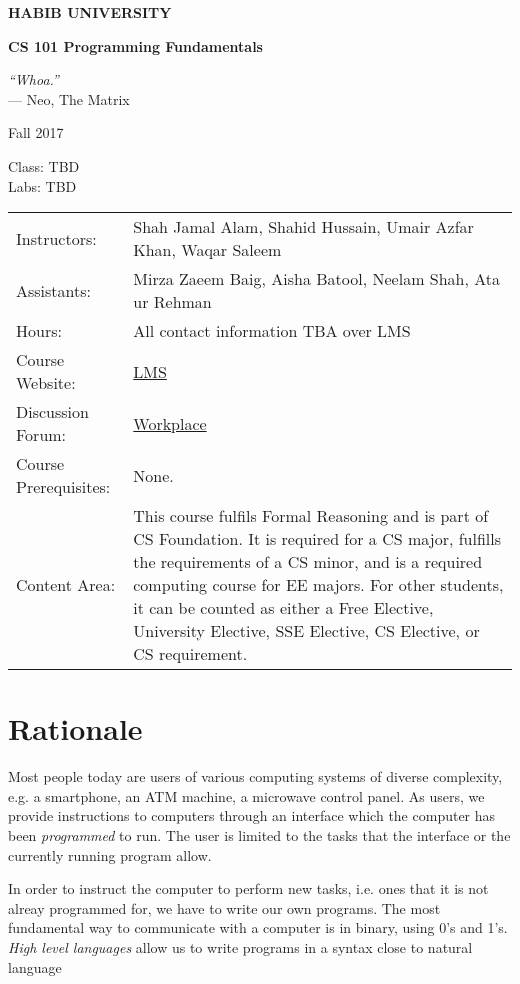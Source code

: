 \documentclass[a4paper]{article}
\begin{document}
\begin{center}

  {\LARGE\bf HABIB UNIVERSITY}\bigskip

  {\large\bf CS 101 Programming Fundamentals}\medskip

  {\it ``Whoa.''}\\--- Neo, The Matrix\medskip

  Fall 2017\medskip
  
  Class: TBD\\
  Labs: TBD

\begin{tabular}{lp{}}
  Instructors:&  Shah Jamal Alam, Shahid Hussain, Umair Azfar Khan, Waqar Saleem \\
  Assistants:& Mirza Zaeem Baig, Aisha Batool, Neelam Shah, Ata ur Rehman\\
  Hours: & All contact information TBA over LMS\\
  Course Website:&  \href{https://lms.habib.edu.pk/}{LMS}\\
  Discussion Forum:& \href{https://habibedu.facebook.com/groups/1809008982742834/}{Workplace}\\
Course Prerequisites:&  None.\\
Content Area: & This course fulfils Formal Reasoning and is part of CS Foundation. It is required for a CS major, fulfills the requirements of a CS minor, and is a required computing course for EE majors. For other students, it can be counted as either a Free Elective, University Elective, SSE Elective, CS Elective, or CS requirement. 
\end{tabular}

\end{center}

\section{Rationale}

Most people today are users of various computing systems of diverse complexity, e.g. a smartphone, an ATM machine, a microwave control panel. As users, we provide instructions to computers through an interface which the computer has been {\it programmed} to run. The user is limited to the tasks that the interface or the currently running program allow.

In order to instruct the computer to perform new tasks, i.e. ones that it is not alreay programmed for, we have to write our own programs. The most fundamental way to communicate with a computer is in binary, using 0's and 1's. {\it High level languages} allow us to write programs in a syntax close to natural language 
\end{document}
